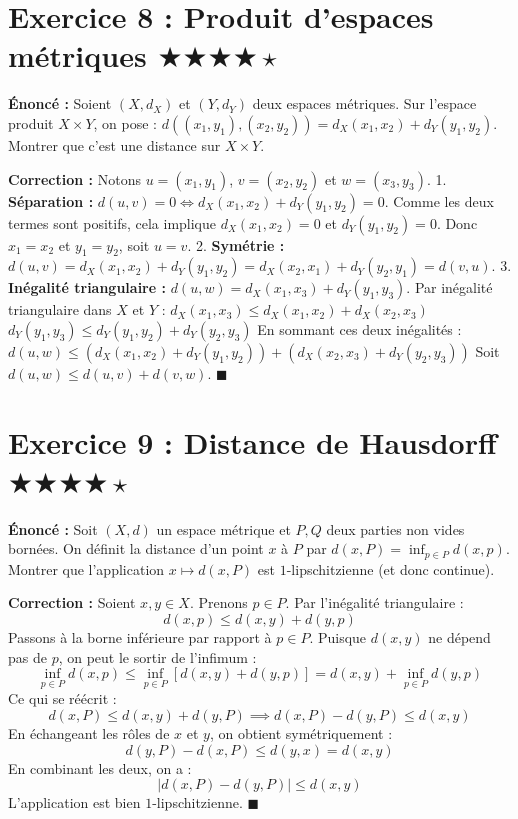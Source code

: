 \documentclass[11pt,a4paper]{article}
\begin{document}
\section*{Exercice 8 : Produit d'espaces métriques \quad $\bigstar\bigstar\bigstar\bigstar\star$}

\textbf{Énoncé :}
Soient $(X, d_X)$ et $(Y, d_Y)$ deux espaces métriques. Sur l'espace produit $X \times Y$, on pose :
$d((x_1, y_1), (x_2, y_2)) = d_X(x_1, x_2) + d_Y(y_1, y_2)$.
Montrer que c'est une distance sur $X \times Y$.

\textbf{Correction :}
Notons $u = (x_1, y_1)$, $v = (x_2, y_2)$ et $w = (x_3, y_3)$.
1. \textbf{Séparation :}
   $d(u,v) = 0 \iff d_X(x_1, x_2) + d_Y(y_1, y_2) = 0$.
   Comme les deux termes sont positifs, cela implique $d_X(x_1, x_2) = 0$ et $d_Y(y_1, y_2) = 0$.
   Donc $x_1=x_2$ et $y_1=y_2$, soit $u=v$.
2. \textbf{Symétrie :}
   $d(u,v) = d_X(x_1, x_2) + d_Y(y_1, y_2) = d_X(x_2, x_1) + d_Y(y_2, y_1) = d(v,u)$.
3. \textbf{Inégalité triangulaire :}
   $d(u,w) = d_X(x_1, x_3) + d_Y(y_1, y_3)$.
   Par inégalité triangulaire dans $X$ et $Y$ :
   $d_X(x_1, x_3) \le d_X(x_1, x_2) + d_X(x_2, x_3)$
   $d_Y(y_1, y_3) \le d_Y(y_1, y_2) + d_Y(y_2, y_3)$
   En sommant ces deux inégalités :
   $d(u,w) \le (d_X(x_1, x_2) + d_Y(y_1, y_2)) + (d_X(x_2, x_3) + d_Y(y_2, y_3))$
   Soit $d(u,w) \le d(u,v) + d(v,w)$. $\blacksquare$


\section*{Exercice 9 : Distance de Hausdorff \quad $\bigstar\bigstar\bigstar\bigstar\star$}

\textbf{Énoncé :}
Soit $(X, d)$ un espace métrique et $P, Q$ deux parties non vides bornées. On définit la distance d'un point $x$ à $P$ par $d(x, P) = \inf_{p \in P} d(x, p)$.
Montrer que l'application $x \mapsto d(x, P)$ est $1$-lipschitzienne (et donc continue).

\textbf{Correction :}
Soient $x, y \in X$. Prenons $p \in P$. Par l'inégalité triangulaire :
$$ d(x, p) \le d(x, y) + d(y, p) $$
Passons à la borne inférieure par rapport à $p \in P$. Puisque $d(x, y)$ ne dépend pas de $p$, on peut le sortir de l'infimum :
$$ \inf_{p \in P} d(x, p) \le \inf_{p \in P} [d(x, y) + d(y, p)] = d(x, y) + \inf_{p \in P} d(y, p) $$
Ce qui se réécrit :
$$ d(x, P) \le d(x, y) + d(y, P) \implies d(x, P) - d(y, P) \le d(x, y) $$
En échangeant les rôles de $x$ et $y$, on obtient symétriquement :
$$ d(y, P) - d(x, P) \le d(y, x) = d(x, y) $$
En combinant les deux, on a :
$$ |d(x, P) - d(y, P)| \le d(x, y) $$
L'application est bien $1$-lipschitzienne. $\blacksquare$
\end{document}
